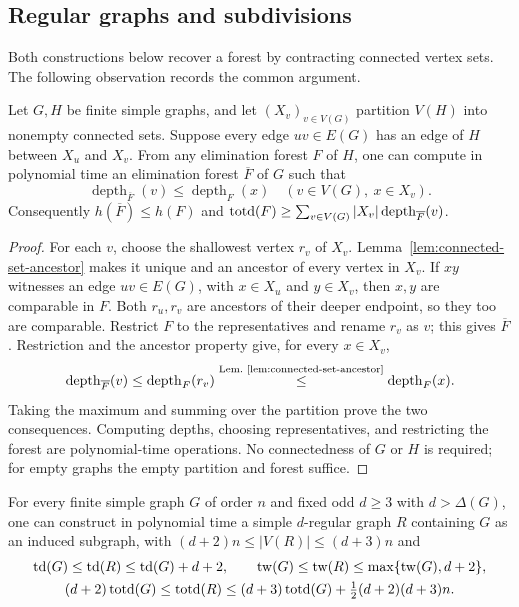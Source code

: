 \subsection{Regular graphs and subdivisions}

Both constructions below recover a forest by contracting connected
vertex sets. The following observation records the common argument.

\begin{lemma}
\label{lem:connected-part-projection}
Let $G,H$ be finite simple graphs, and let
$(X_v)_{v\in V(G)}$ partition $V(H)$ into nonempty connected sets.
Suppose every edge $uv\in E(G)$ has an edge of $H$ between $X_u$
and $X_v$. From any elimination forest $F$ of $H$, one can compute
in polynomial time an elimination forest $\overline F$ of $G$ such that
\[
 \operatorname{depth}_{\overline F}(v)\le\operatorname{depth}_F(x)
 \quad(v\in V(G),\ x\in X_v).
\]
Consequently $h(\overline F)\le h(F)$ and
$\operatorname{totd}(F)\ge\sum_{v\in V(G)}|X_v|\operatorname{depth}_{\overline F}(v)$.
\end{lemma}

\begin{proof}
For each $v$, choose the shallowest vertex $r_v$ of $X_v$.
Lemma~\ref{lem:connected-set-ancestor} makes it unique and an ancestor
of every vertex in $X_v$. If $xy$ witnesses an edge $uv\in E(G)$,
with $x\in X_u$ and $y\in X_v$, then $x,y$ are comparable in $F$.
Both $r_u,r_v$ are ancestors of their deeper endpoint, so they too
are comparable. Restrict $F$ to the representatives and rename
$r_v$ as $v$; this gives $\overline F$. Restriction and the ancestor
property give, for every $x\in X_v$,
\[
 \operatorname{depth}_{\overline F}(v)
 \le\operatorname{depth}_F(r_v)
 \overset{\text{Lem.~\ref{lem:connected-set-ancestor}}}{\le}
 \operatorname{depth}_F(x).
\]
Taking the maximum and summing over the partition prove the two
consequences. Computing depths, choosing representatives, and restricting
the forest are polynomial-time operations. No connectedness of $G$ or
$H$ is required; for empty graphs the empty partition and forest suffice.
\end{proof}

\begin{proposition}\label{prop:regularization}
For every finite simple graph $G$ of order $n$ and fixed odd $d\geq3$ with
$d>\Delta(G)$, one can construct in polynomial time a simple
$d$-regular graph $R$ containing $G$ as an induced subgraph, with
$(d+2)n\leq |V(R)|\leq(d+3)n$ and
\[
\begin{gathered}
 \operatorname{td}(G)\leq\operatorname{td}(R)\leq\operatorname{td}(G)+d+2,\qquad \operatorname{tw}(G)\leq\operatorname{tw}(R)
 \leq\max\{\operatorname{tw}(G),d+2\},\\
 (d+2)\operatorname{totd}(G)\leq\operatorname{totd}(R)
 \leq(d+3)\operatorname{totd}(G)+\tfrac12(d+2)(d+3)n.
\end{gathered}
\]
\end{proposition}

